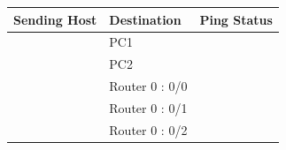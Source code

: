 \documentclass[a4paper,11pt]{article}
\begin{document}
\begin{enumerate}
\begin{itemize}



                    \begin{table}[H]
                        \centering

                        \begin{tabular}{| m{10em}| m{10em}| m{10em} |}
                            \hline
                            \multicolumn{1}{|l|}{\textbf{Sending Host}}                     & \textbf{Destination} & \multicolumn{1}{l|}{\textbf{Ping Status}}                                  \\
                            \hline
                            {\cellcolor[rgb]{0.141,0.525,1}}                                & PC1                  & {\cellcolor[rgb]{0.42,0.988,0.827}}                                        \\
                            \hhline{|>{\arrayrulecolor[rgb]{0.141,0.525,1}}->{\arrayrulecolor{black}}->{\arrayrulecolor[rgb]{0.42,0.988,0.827}}->{\arrayrulecolor{black}}|}
                            {\cellcolor[rgb]{0.141,0.525,1}}                                & PC2                  & {\cellcolor[rgb]{0.42,0.988,0.827}}                                        \\
                            \hhline{|>{\arrayrulecolor[rgb]{0.141,0.525,1}}->{\arrayrulecolor{black}}->{\arrayrulecolor[rgb]{0.42,0.988,0.827}}->{\arrayrulecolor{black}}|}
                            {\cellcolor[rgb]{0.141,0.525,1}}                                & Router 0 : 0/0       & {\cellcolor[rgb]{0.42,0.988,0.827}}                                        \\
                            \hhline{|>{\arrayrulecolor[rgb]{0.141,0.525,1}}->{\arrayrulecolor{black}}->{\arrayrulecolor[rgb]{0.42,0.988,0.827}}->{\arrayrulecolor{black}}|}
                            {\cellcolor[rgb]{0.141,0.525,1}}                                & Router 0 : 0/1       & {\cellcolor[rgb]{0.42,0.988,0.827}}                                        \\
                            \hhline{|>{\arrayrulecolor[rgb]{0.141,0.525,1}}->{\arrayrulecolor{black}}->{\arrayrulecolor[rgb]{0.42,0.988,0.827}}->{\arrayrulecolor{black}}|}
                            {\cellcolor[rgb]{0.141,0.525,1}}                                & Router 0 : 0/2       & {\cellcolor[rgb]{0.42,0.988,0.827}}                                        \\

\end{tabular}
\end{table}
\end{itemize}
\end{enumerate}
\end{document}
